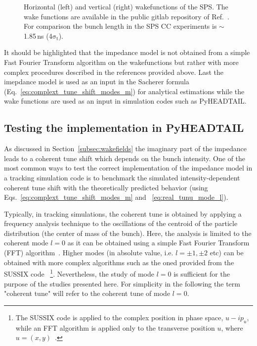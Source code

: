 \begin{figure}[!ht]
\begin{subfigure}[t]{0.45\textwidth}
    \end{subfigure}
    \hfill
     \caption{Horizontal (left) and vertical (right) wakefunctions of the SPS. The wake functions are available in the public gitlab repository of Ref.~\cite{sps_impedance_model_git}. For comparison the bunch length in the SPS CC experiments is $\sim$ 1.85\,ns (4$\mathrm{\sigma_t}$).} %
     \label{fig:sps_wakefunctions_model_H_V}
 \end{figure}

It should be highlighted that the impedance model is not obtained from a simple Fast Fourier Transform algorithm on the wakefunctions but rather with more complex procedures described in the references provided above. Last the imepdance model is used as an input in the Sacherer formula (Eq.~\eqref{eq:complext_tune_shift_modes_m}) for analytical estimations while the wake functions are used as an input in simulation codes such as PyHEADTAIL.




\subsection{Testing the implementation in PyHEADTAIL}\label{subsec:test_implementation_pyheatail}
As discussed in Section~\ref{subsec:wakefields} the imaginary part of the impedance leads to a coherent tune shift which depends on the bunch intensity. One of the most common ways to test the correct implementation of the impedance model in a tracking simulation code is to benchmark the simulated intensity-dependent coherent tune shift with the theoretically predicted behavior (using Eqs.~\eqref{eq:complext_tune_shift_modes_m} and ~\eqref{eq:real_tunu_mode_l}).

Typically, in tracking simulations, the coherent tune is obtained by applying a frequency analysis technique to the oscillations of the centroid of the particle distribution (the center of mass of the bunch). Here, the analysis is limited to the coherent mode $l=0$ as it can be obtained using a simple Fast Fourier Transform (FFT) algorithm~\cite{FFT_and_applications}. Higher modes (in absolute value, i.e. $l=\pm 1, \pm 2$ etc) can be obtained with more complex algorithms such as the oned provided from the SUSSIX code~\cite{Bartolini:702438} \footnote{The SUSSIX code is applied to the complex position in phase space, $u-i p_u$, while an FFT algorithm is applied only to the transverse position $u$, where $u=(x,y)$~\cite{Salvant:1274254}.}. Nevertheless, the study of mode $l=0$ is sufficient for the purpose of the studies presented here. For simplicity in the following the term "coherent tune" will refer to the coherent tune of mode $l=0$.

